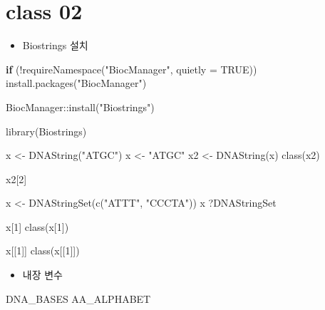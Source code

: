 \documentclass[
]{book}
\newenvironment{Shaded}{\begin{snugshade}}{\end{snugshade}}
\newcommand{\AttributeTok}[1]{\textcolor[rgb]{0.77,0.63,0.00}{#1}}
\newcommand{\ConstantTok}[1]{\textcolor[rgb]{0.00,0.00,0.00}{#1}}
\newcommand{\ControlFlowTok}[1]{\textcolor[rgb]{0.13,0.29,0.53}{\textbf{#1}}}
\newcommand{\DecValTok}[1]{\textcolor[rgb]{0.00,0.00,0.81}{#1}}
\newcommand{\FunctionTok}[1]{\textcolor[rgb]{0.00,0.00,0.00}{#1}}
\newcommand{\NormalTok}[1]{#1}
\newcommand{\OtherTok}[1]{\textcolor[rgb]{0.56,0.35,0.01}{#1}}
\newcommand{\SpecialCharTok}[1]{\textcolor[rgb]{0.00,0.00,0.00}{#1}}
\newcommand{\StringTok}[1]{\textcolor[rgb]{0.31,0.60,0.02}{#1}}
\providecommand{\tightlist}{%
  \setlength{\itemsep}{0pt}\setlength{\parskip}{0pt}}
\begin{document}
\hypertarget{class-02-2}{%
\section{class 02}\label{class-02-2}}

\begin{itemize}
\tightlist
\item
  Biostrings 설치
\end{itemize}

\begin{Shaded}
\begin{Highlighting}[]
\ControlFlowTok{if}\NormalTok{ (}\SpecialCharTok{!}\FunctionTok{requireNamespace}\NormalTok{(}\StringTok{"BiocManager"}\NormalTok{, }\AttributeTok{quietly =} \ConstantTok{TRUE}\NormalTok{))}
    \FunctionTok{install.packages}\NormalTok{(}\StringTok{"BiocManager"}\NormalTok{)}

\NormalTok{BiocManager}\SpecialCharTok{::}\FunctionTok{install}\NormalTok{(}\StringTok{"Biostrings"}\NormalTok{)}

\FunctionTok{library}\NormalTok{(Biostrings)}

\NormalTok{x }\OtherTok{\textless{}{-}} \FunctionTok{DNAString}\NormalTok{(}\StringTok{"ATGC"}\NormalTok{)}
\NormalTok{x }\OtherTok{\textless{}{-}} \StringTok{"ATGC"}
\NormalTok{x2 }\OtherTok{\textless{}{-}} \FunctionTok{DNAString}\NormalTok{(x)}
\FunctionTok{class}\NormalTok{(x2)}


\NormalTok{x2[}\DecValTok{2}\NormalTok{]}

\NormalTok{x }\OtherTok{\textless{}{-}} \FunctionTok{DNAStringSet}\NormalTok{(}\FunctionTok{c}\NormalTok{(}\StringTok{"ATTT"}\NormalTok{, }\StringTok{"CCCTA"}\NormalTok{))}
\NormalTok{x}
\NormalTok{?DNAStringSet}

\NormalTok{x[}\DecValTok{1}\NormalTok{]}
\FunctionTok{class}\NormalTok{(x[}\DecValTok{1}\NormalTok{])}

\NormalTok{x[[}\DecValTok{1}\NormalTok{]]}
\FunctionTok{class}\NormalTok{(x[[}\DecValTok{1}\NormalTok{]])}
\end{Highlighting}
\end{Shaded}

\begin{itemize}
\tightlist
\item
  내장 변수
\end{itemize}

\begin{Shaded}
\begin{Highlighting}[]
\NormalTok{DNA\_BASES}
\NormalTok{AA\_ALPHABET}
\end{Highlighting}
\end{Shaded}
\end{document}
